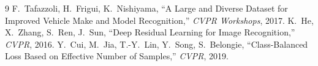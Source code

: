 \documentclass[10pt,a4paper,twocolumn]{article}
\begin{document}
{\footnotesize
\begin{thebibliography}{9}\setlength{\itemsep}{0pt}
 F.~Tafazzoli, H.~Frigui, K.~Nishiyama, ``A Large and Diverse Dataset for Improved Vehicle Make and Model Recognition,'' \textit{CVPR Workshops}, 2017.
 K.~He, X.~Zhang, S.~Ren, J.~Sun, ``Deep Residual Learning for Image Recognition,'' \textit{CVPR}, 2016.
 Y.~Cui, M.~Jia, T.-Y.~Lin, Y.~Song, S.~Belongie, ``Class-Balanced Loss Based on Effective Number of Samples,'' \textit{CVPR}, 2019.
\end{thebibliography}
}
\end{document}
